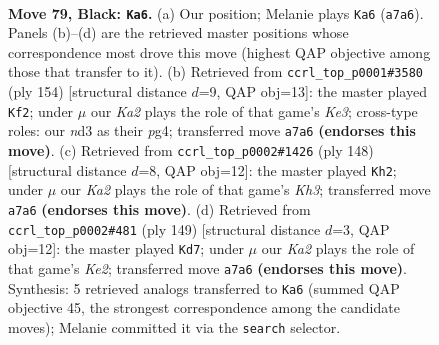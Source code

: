 \documentclass[11pt]{article}
\begin{document}
\clearpage

\begin{figure}[p]\centering
\begin{subfigure}{0.46\textwidth}\centering
\resizebox{\linewidth}{!}{%
\newchessgame
\chessboard[
  setfen={8/k7/8/7K/8/1R1N4/6P1/3r4 b - - 23 79},
  showmover=false,
  pgfstyle=straightmove, color=movearrow, markmove={a7-a6}
]}
\caption{}
\end{subfigure}\hfill
\begin{subfigure}{0.46\textwidth}\centering
\resizebox{\linewidth}{!}{%
\newchessgame
\chessboard[
  setfen={8/4k3/7P/6R1/r5p1/4K3/8/8 w - - 1 78},
  showmover=false,
  pgfstyle=straightmove, color=movearrow, markmove={e3-f2}
]}
\caption{}
\end{subfigure}
\\[4pt]
\begin{subfigure}{0.46\textwidth}\centering
\resizebox{\linewidth}{!}{%
\newchessgame
\chessboard[
  setfen={5r2/4R3/8/8/4n3/P4k1K/8/8 w - - 14 75},
  showmover=false,
  pgfstyle=straightmove, color=movearrow, markmove={h3-h2}
]}
\caption{}
\end{subfigure}\hfill
\begin{subfigure}{0.46\textwidth}\centering
\resizebox{\linewidth}{!}{%
\newchessgame
\chessboard[
  setfen={8/4k3/2R5/4p3/6K1/8/1rN5/8 b - - 0 75},
  showmover=false,
  pgfstyle=straightmove, color=movearrow, markmove={e7-d7}
]}
\caption{}
\end{subfigure}
\caption{\textbf{Move 79, Black: \texttt{Ka6}.} (a) Our position; Melanie plays \texttt{Ka6} (\texttt{a7a6}). Panels (b)--(d) are the retrieved master positions whose correspondence most drove this move (highest QAP objective among those that transfer to it). (b) Retrieved from \texttt{ccrl\_top\_p0001\#3580} (ply 154) [structural distance $d$=9, QAP obj=13]: the master played \texttt{Kf2}; under $\mu$ our \emph{Ka2} plays the role of that game's \emph{Ke3}; cross-type roles: our \emph{n}d3 as their \emph{p}g4; transferred move \texttt{a7a6} \textbf{(endorses this move)}. (c) Retrieved from \texttt{ccrl\_top\_p0002\#1426} (ply 148) [structural distance $d$=8, QAP obj=12]: the master played \texttt{Kh2}; under $\mu$ our \emph{Ka2} plays the role of that game's \emph{Kh3}; transferred move \texttt{a7a6} \textbf{(endorses this move)}. (d) Retrieved from \texttt{ccrl\_top\_p0002\#481} (ply 149) [structural distance $d$=3, QAP obj=12]: the master played \texttt{Kd7}; under $\mu$ our \emph{Ka2} plays the role of that game's \emph{Ke2}; transferred move \texttt{a7a6} \textbf{(endorses this move)}. Synthesis: 5 retrieved analogs transferred to \texttt{Ka6} (summed QAP objective 45, the strongest correspondence among the candidate moves); Melanie committed it via the \texttt{search} selector.}
\label{fig:thought-m157}
\end{figure}
\end{document}
